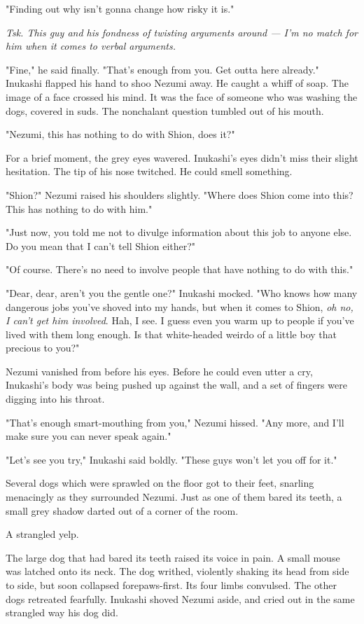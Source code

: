 "Finding out why isn't gonna change how risky it is."

\emph{Tsk. This guy and his fondness of twisting arguments around --- I'm no
match for him when it comes to verbal arguments.}

"Fine," he said finally. "That's enough from you. Get outta here
already." Inukashi flapped his hand to shoo Nezumi away. He caught a
whiff of soap. The image of a face crossed his mind. It was the face of
someone who was washing the dogs, covered in suds. The nonchalant
question tumbled out of his mouth.

"Nezumi, this has nothing to do with Shion, does it?"

For a brief moment, the grey eyes wavered. Inukashi's eyes didn't miss
their slight hesitation. The tip of his nose twitched. He could smell
something.

"Shion?" Nezumi raised his shoulders slightly. "Where does Shion come
into this? This has nothing to do with him."

"Just now, you told me not to divulge information about this job to
anyone else. Do you mean that I can't tell Shion either?"

"Of course. There's no need to involve people that have nothing to do
with this."

"Dear, dear, aren't you the gentle one?" Inukashi mocked. "Who knows how
many dangerous jobs you've shoved into my hands, but when it comes to
Shion, \emph{oh no, I can't get him involved}. Hah, I see. I guess even you
warm up to people if you've lived with them long enough. Is that
white-headed weirdo of a little boy that precious to you?"

Nezumi vanished from before his eyes. Before he could even utter a cry,
Inukashi's body was being pushed up against the wall, and a set of
fingers were digging into his throat.

"That's enough smart-mouthing from you," Nezumi hissed. "Any more, and
I'll make sure you can never speak again."

"Let's see you try," Inukashi said boldly. "These guys won't let you off
for it."

Several dogs which were sprawled on the floor got to their feet,
snarling menacingly as they surrounded Nezumi. Just as one of them bared
its teeth, a small grey shadow darted out of a corner of the room.

A strangled yelp.

The large dog that had bared its teeth raised its voice in pain. A small
mouse was latched onto its neck. The dog writhed, violently shaking its
head from side to side, but soon collapsed forepaws-first. Its four
limbs convulsed. The other dogs retreated fearfully. Inukashi shoved
Nezumi aside, and cried out in the same strangled way his dog did.

